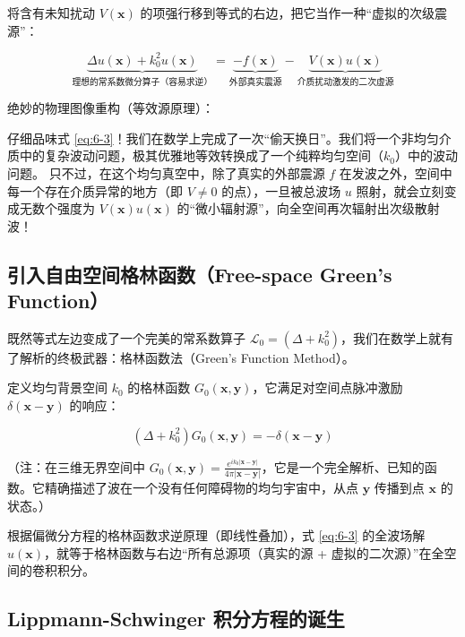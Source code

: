 \documentclass[12pt]{article}
\begin{document}
{将含有未知扰动 $V(\mathbf{x})$ 的项强行移到等式的右边，把它当作一种“虚拟的次级震源”：

\begin{equation}
\underbrace{\Delta u(\mathbf{x}) + k_0^2 u(\mathbf{x})}_{\text{理想的常系数微分算子（容易求逆）}}
=
\underbrace{-f(\mathbf{x})}_{\text{外部真实震源}}
-
\underbrace{V(\mathbf{x})u(\mathbf{x})}_{\text{介质扰动激发的二次虚源}}
\label{eq:6-3}
\end{equation}

绝妙的物理图像重构（等效源原理）：

仔细品味式 \eqref{eq:6-3}！我们在数学上完成了一次“偷天换日”。我们将一个非均匀介质中的复杂波动问题，极其优雅地等效转换成了一个纯粹均匀空间（$k_0$）中的波动问题。
只不过，在这个均匀真空中，除了真实的外部震源 $f$ 在发波之外，空间中每一个存在介质异常的地方（即 $V \neq 0$ 的点），一旦被总波场 $u$ 照射，就会立刻变成无数个强度为 $V(\mathbf{x})u(\mathbf{x})$ 的“微小辐射源”，向全空间再次辐射出次级散射波！

\subsection{引入自由空间格林函数（Free-space Green's Function）}

既然等式左边变成了一个完美的常系数算子 $\mathcal{L}_0 = (\Delta + k_0^2)$，我们在数学上就有了解析的终极武器：格林函数法（Green's Function Method）。

定义均匀背景空间 $k_0$ 的格林函数 $G_0(\mathbf{x}, \mathbf{y})$，它满足对空间点脉冲激励 $\delta(\mathbf{x} - \mathbf{y})$ 的响应：

\begin{equation}
(\Delta + k_0^2) G_0(\mathbf{x}, \mathbf{y}) = -\delta(\mathbf{x} - \mathbf{y})
\label{eq:6-4}
\end{equation}

（注：在三维无界空间中 $G_0(\mathbf{x}, \mathbf{y}) = \frac{e^{i k_0 |\mathbf{x} - \mathbf{y}|}}{4\pi |\mathbf{x} - \mathbf{y}|}$，它是一个完全解析、已知的函数。它精确描述了波在一个没有任何障碍物的均匀宇宙中，从点 $\mathbf{y}$ 传播到点 $\mathbf{x}$ 的状态。）

根据偏微分方程的格林函数求逆原理（即线性叠加），式 \eqref{eq:6-3} 的全波场解 $u(\mathbf{x})$，就等于格林函数与右边“所有总源项（真实的源 + 虚拟的二次源）”在全空间的卷积积分。

\subsection{Lippmann-Schwinger 积分方程的诞生}

}
\end{document}
